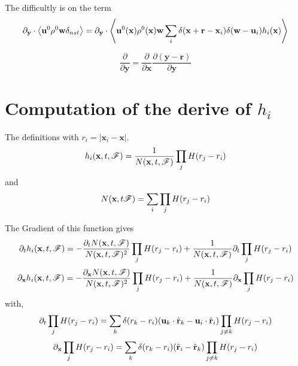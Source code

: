 \documentclass[11pt]{My_preprint}
\begin{document}
The difficultly is on the term 
\begin{equation*}
    {\partial_\textbf{y}} \cdot \left<\textbf{u}^0\rho^0 \textbf{w}   \delta_{nst} \right>
    = 
    {\partial_\textbf{y}} \cdot \left<\textbf{u}^0(\textbf{x})\rho^0(\textbf{x}) \textbf{w}   \sum_i \delta(\textbf{x}+ \textbf{r} - \textbf{x}_i)\delta(\textbf{w}- \textbf{u}_i) h_i(\textbf{x}) \right>
\end{equation*}


\begin{equation*}
    \frac{\partial }{\partial \textbf{y}}
    = 
    \frac{\partial }{\partial \textbf{x}}
    \frac{\partial (\textbf{y} - \textbf{r} )}{\partial \textbf{y}}
\end{equation*}




\appendix

\section*{Computation of the derive of $h_i$}

The definitions with $r_i = |\textbf{x}_i - \textbf{x}|$.  
\begin{equation*}
    h_i(\textbf{x},t,\mathscr{F})
    = 
    \frac{1}{N(\textbf{x},t,\mathscr{F})}
    \prod_j
    H(r_j - r_i)
\end{equation*}
and 
\begin{equation*}
    N(\textbf{x},t\mathscr{F})
    = \sum_i \prod_j 
    H(r_j - r_i)
\end{equation*}

The Gradient of this function gives
\begin{equation*}
    \partial_t  h_i(\textbf{x},t,\mathscr{F})
    = 
    -  \frac{\partial_t N(\textbf{x},t,\mathscr{F})}{N(\textbf{x},t,\mathscr{F})^2}
    \prod_j
    H(r_j - r_i)
    + \frac{1}{N(\textbf{x},t,\mathscr{F})}
    \partial_t \prod_j
    H(r_j - r_i)
\end{equation*}
\begin{equation*}
    {\partial_\textbf{x}}  h_i(\textbf{x},t,\mathscr{F})
    = 
    -  \frac{{\partial_\textbf{x}} N(\textbf{x},t,\mathscr{F})}{N(\textbf{x},t,\mathscr{F})^2}
    \prod_j
    H(r_j - r_i)
    + \frac{1}{N(\textbf{x},t,\mathscr{F})}
    {\partial_\textbf{x}} \prod_j
    H(r_j - r_i)
\end{equation*}
with, 
\begin{equation*}
    \partial_t 
    \prod_j
    H(r_j - r_i)
    = 
    \sum_k 
    \delta(r_k - r_i)
    (\textbf{u}_k  \cdot \hat{\textbf{r}}_k - \textbf{u}_i  \cdot \hat{\textbf{r}}_i)
    \prod_{j\neq k}
    H(r_j - r_i)
\end{equation*}
\begin{equation*}
    {\partial_\textbf{x}}
    \prod_j
    H(r_j - r_i)
    = 
    \sum_k 
    \delta(r_k - r_i)
    ( \hat{\textbf{r}}_i -  \hat{\textbf{r}}_k)
    \prod_{j\neq k}
    H(r_j - r_i)
\end{equation*}
\end{document}
